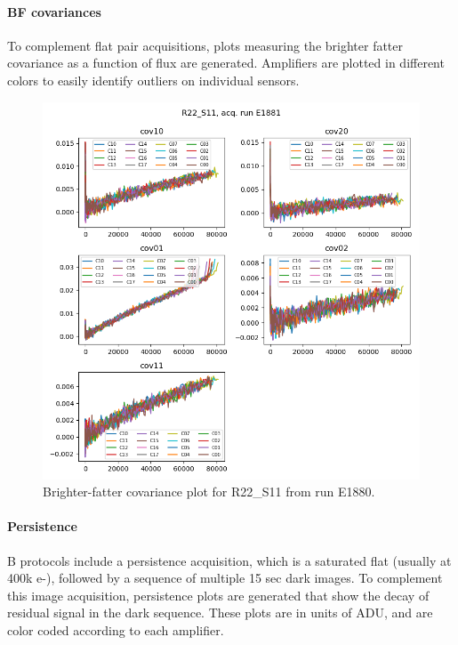 \clearpage

\paragraph{BF covariances}

To complement flat pair acquisitions, plots measuring the brighter fatter covariance as a function of flux are generated. Amplifiers are plotted in different colors to easily identify outliers on individual sensors. 

\begin{figure}
    \centering
    \includegraphics[width=0.8\linewidth]{figures/ReferenceFigures/bf_covariance_plots_LSSTCam_R22_S11_u_lsstccs_eo_bf_analysis_E1881_w_2024_35_20241105T131510Z.png}
    \caption{Brighter-fatter covariance plot for R22\_S11 from run E1880.}
    \label{fig:ref:bfCov}
\end{figure}

\clearpage
\paragraph{Persistence}

B protocols include a persistence acquisition, which is a saturated flat (usually at 400k e-), followed by a sequence of multiple 15 sec dark images. To complement this image acquisition, persistence plots are generated that show the decay of residual signal in the dark sequence. These plots are in units of ADU, and are color coded according to each amplifier.

